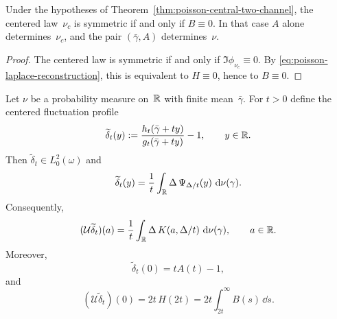 \begin{corollary}%
\label{cor:poisson-symmetric-case}
Under the hypotheses of Theorem~\ref{thm:poisson-central-two-channel}, the
centered law~$\nu_c$ is symmetric if and only if $B\equiv 0$.  In that
case $A$ alone determines~$\nu_c$, and the pair $(\bar\gamma,A)$
determines~$\nu$.
\end{corollary}

\begin{proof}
The centered law is symmetric if and only if
$\Im\phi_{\nu_c}\equiv 0$.  By
\eqref{eq:poisson-laplace-reconstruction}, this is equivalent to
$H\equiv 0$, hence to $B\equiv 0$.
\end{proof}

\begin{theorem}%
\label{thm:poisson-channel-rkhs}
Let $\nu$ be a probability measure on~$\mathbb{R}$ with finite mean~$\bar\gamma$.
For $t>0$ define the centered fluctuation profile
\[
\widetilde\delta_t(y):=
\frac{h_t(\bar\gamma+ty)}{g_t(\bar\gamma+ty)}-1,
\qquad y\in\mathbb{R}.
\]
Then $\widetilde\delta_t\in L^2_0(\omega)$ and
\begin{equation}\label{eq:delta-t-secant}
\widetilde\delta_t(y)
=\frac{1}{t}\int_{\mathbb{R}}\Delta\,\Psi_{\Delta/t}(y)\,\,\mathrm{d}\nu(\gamma).
\end{equation}
Consequently,
\begin{equation}\label{eq:delta-t-rkhs}
(\mathcal U\widetilde\delta_t)(a)
=\frac{1}{t}\int_{\mathbb{R}}\Delta\,K(a,\Delta/t)\,\,\mathrm{d}\nu(\gamma),
\qquad a\in\mathbb{R}.
\end{equation}
Moreover,
\begin{equation}\label{eq:delta-t-origin}
\widetilde\delta_t(0)=tA(t)-1,
\end{equation}
and
\begin{equation}\label{eq:delta-t-rkhs-origin}
(\mathcal U\widetilde\delta_t)(0)=2t\,H(2t)
=2t\int_{2t}^{\infty}B(s)\,\dd s.
\end{equation}
\end{theorem}

